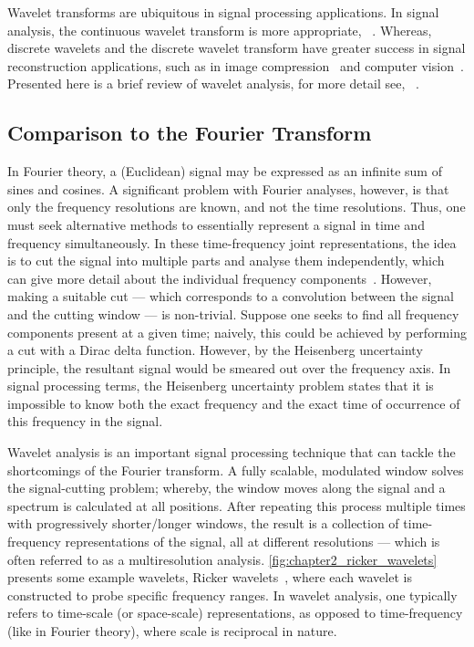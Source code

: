 Wavelet transforms are ubiquitous in signal processing applications.
In signal analysis, the continuous wavelet transform is more appropriate, \eg{}~\cite{Goupillaud1984,KronlandMartinet1987,Flandrin1989,Holschneider1990,Bertrand1990,Pierce1991}.
Whereas, discrete wavelets and the discrete wavelet transform have greater success in signal reconstruction applications, such as in image compression~\cite{Antonini1990,Mallat1992} and computer vision~\cite{Mallat1989,Shensa1992}.
Presented here is a brief review of wavelet analysis, for more detail see, \eg{}~\cite{Rioul1991,Graps1995,Addison2005,Valens1999,Kaiser2011}.

\subsection{Comparison to the Fourier Transform}\label{sec:chapter2_comparison_fourier_transform}

In Fourier theory, a (Euclidean) signal may be expressed as an infinite sum of sines and cosines.
A significant problem with Fourier analyses, however, is that only the frequency resolutions are known, and not the time resolutions.
Thus, one must seek alternative methods to essentially represent a signal in time and frequency simultaneously.
In these time-frequency joint representations, the idea is to cut the signal into multiple parts and analyse them independently, which can give more detail about the individual frequency components~\cite{Mallat2008}.
However, making a suitable cut --- which corresponds to a convolution between the signal and the cutting window --- is non-trivial.
Suppose one seeks to find all frequency components present at a given time; naively, this could be achieved by performing a cut with a Dirac delta function.
However, by the Heisenberg uncertainty principle, the resultant signal would be smeared out over the frequency axis.
In signal processing terms, the Heisenberg uncertainty problem states that it is impossible to know both the exact frequency and the exact time of occurrence of this frequency in the signal.

Wavelet analysis is an important signal processing technique that can tackle the shortcomings of the Fourier transform.
A fully scalable, modulated window solves the signal-cutting problem; whereby, the window moves along the signal and a spectrum is calculated at all positions.
After repeating this process multiple times with progressively shorter/longer windows, the result is a collection of time-frequency representations of the signal, all at different resolutions --- which is often referred to as a multiresolution analysis.
\cref{fig:chapter2_ricker_wavelets} presents some example wavelets, Ricker wavelets~\cite{Ricker1953}, where each wavelet is constructed to probe specific frequency ranges.
In wavelet analysis, one typically refers to time-scale (or space-scale) representations, as opposed to time-frequency (like in Fourier theory), where scale is reciprocal in nature.

